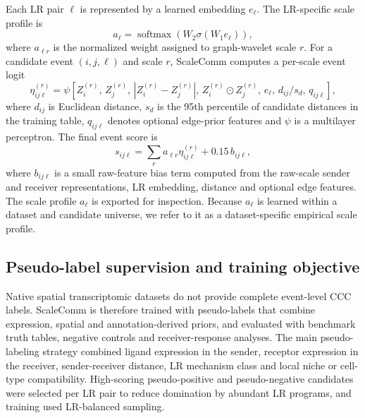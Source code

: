 \documentclass[referee,lineno,pdflatex,sn-vancouver-num]{sn-jnl}
\begin{document}
Each LR pair $\ell$ is represented by a learned embedding $e_\ell$. The LR-specific scale profile is
\begin{equation}
a_\ell = \operatorname{softmax}(W_2 \sigma(W_1 e_\ell)),
\end{equation}
where $a_{\ell r}$ is the normalized weight assigned to graph-wavelet scale $r$. For a candidate event $(i,j,\ell)$ and scale $r$, ScaleComm computes a per-scale event logit
\begin{equation}
\eta^{(r)}_{ij\ell} =
\psi\left[
Z^{(r)}_i,\,
Z^{(r)}_j,\,
\left|Z^{(r)}_i-Z^{(r)}_j\right|,\,
Z^{(r)}_i \odot Z^{(r)}_j,\,
e_\ell,\,
d_{ij}/s_d,\,
q_{ij\ell}
\right],
\end{equation}
where $d_{ij}$ is Euclidean distance, $s_d$ is the 95th percentile of candidate distances in the training table, $q_{ij\ell}$ denotes optional edge-prior features and $\psi$ is a multilayer perceptron. The final event score is
\begin{equation}
s_{ij\ell} = \sum_r a_{\ell r}\eta^{(r)}_{ij\ell} + 0.15\,b_{ij\ell},
\end{equation}
where $b_{ij\ell}$ is a small raw-feature bias term computed from the raw-scale sender and receiver representations, LR embedding, distance and optional edge features. The scale profile $a_\ell$ is exported for inspection. Because $a_\ell$ is learned within a dataset and candidate universe, we refer to it as a dataset-specific empirical scale profile.

\subsection{Pseudo-label supervision and training objective}

Native spatial transcriptomic datasets do not provide complete event-level CCC labels. ScaleComm is therefore trained with pseudo-labels that combine expression, spatial and annotation-derived priors, and evaluated with benchmark truth tables, negative controls and receiver-response analyses. The main pseudo-labeling strategy combined ligand expression in the sender, receptor expression in the receiver, sender-receiver distance, LR mechanism class and local niche or cell-type compatibility. High-scoring pseudo-positive and pseudo-negative candidates were selected per LR pair to reduce domination by abundant LR programs, and training used LR-balanced sampling.
\end{document}

